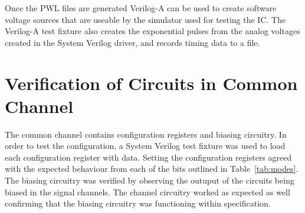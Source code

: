 \documentclass[12pt,oneside,final]{siuethesis}
\theoremstyle{definition}
\begin{document}


\par Once the PWL files are generated Verilog-A can be used to create software voltage sources that are useable by the simulator used for testing the IC. The Verilog-A test fixture also creates the exponential pulses from the analog voltages created in the System Verilog driver, and records timing data to a file.

\section{Verification of Circuits in Common Channel}
\par The common channel contains configuration registers and biasing circuitry. In order to test the configuration, a System Verilog test fixture was used to load each configuration register with data. Setting the configuration registers agreed with the expected behaviour from each of the bits outlined in Table~\ref{tab:modes}. The biasing circuitry was verified by observing the outuput of the circuits being biased in the signal channels. The channel circuitry worked as expected as well confirming that the biasing circuitry was functioning within specification.
\end{document}
